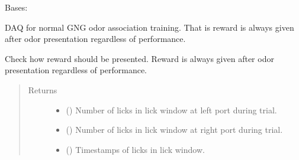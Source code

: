 \documentclass[letterpaper,10pt,english]{sphinxmanual}
\begin{document}
\begin{fulllineitems}
\label{\detokenize{NoSeMazeController/daqface:daqface.DAQ.DoAiMultiTaskOdourTraining}}
\pysigstartsignatures
{}
\pysigstopsignatures
\sphinxAtStartPar
Bases: 

\sphinxAtStartPar
DAQ for normal GNG odor association training. That is reward is always given after
odor presentation regardless of performance.

\begin{fulllineitems}
\label{\detokenize{NoSeMazeController/daqface:daqface.DAQ.DoAiMultiTaskOdourTraining.CheckLicks}}
\pysigstartsignatures
{}
\pysigstopsignatures
\sphinxAtStartPar
Check how reward should be presented. Reward is always given after
odor presentation regardless of performance.
\begin{quote}\begin{description}
\item[{Returns}] \leavevmode
\sphinxAtStartPar
\begin{itemize}
\item {} 
\sphinxAtStartPar
{} () \textendash{} Number of licks in lick window at left port during trial.

\item {} 
\sphinxAtStartPar
{} () \textendash{} Number of licks in lick window at right port during trial.

\item {} 
\sphinxAtStartPar
{} () \textendash{} Timestamps of licks in lick window.


\end{itemize}
\end{description}
\end{quote}
\end{fulllineitems}
\end{fulllineitems}
\end{document}
